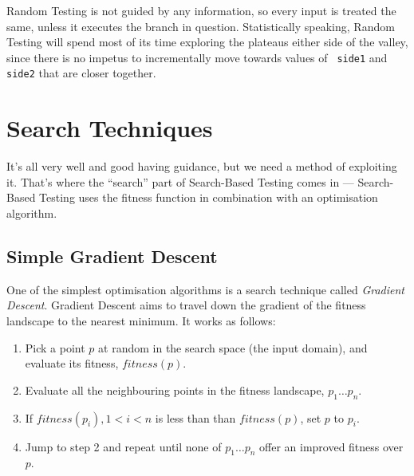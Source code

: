 Random Testing is not guided by any information, so every input is treated the
same, unless it executes the branch in question. Statistically speaking, Random
Testing will spend most of its time exploring the plateaus either side of the
valley, since there is no impetus to incrementally move towards values of {\tt
side1} and {\tt side2} that are closer together.


\section{Search Techniques}

It's all very well and good having guidance, but we need a method of exploiting
it. That's where the ``search'' part of Search-Based Testing comes in ---
Search-Based Testing uses the fitness function in combination with an
optimisation algorithm. 


\subsection{Simple Gradient Descent}

One of the simplest optimisation algorithms is a search technique called {\it
Gradient Descent}. Gradient Descent aims to travel down the gradient of the
fitness landscape to the nearest minimum. It works as follows:


\begin{enumerate}
    \item Pick a point $p$ at random in the search space (the input domain), and
    evaluate its fitness, $\mathit{fitness}(p)$.

    \item Evaluate all the neighbouring points in the fitness landscape, $p_1
    \dots p_n$.

    \item If $\mathit{fitness}(p_i), 1 < i < n$ is less than than
    $\mathit{fitness}(p)$, set $p$ to $p_i$.

    \item Jump to step 2 and repeat until none of $p_1 \dots p_n$ offer an
    improved fitness over $p$.
\end{enumerate}


